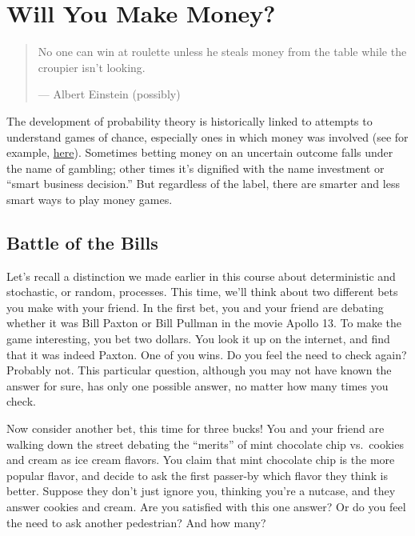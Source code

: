 \documentclass[openany]{book}
\begin{document}
\hypertarget{will-you-make-money}{%
\chapter*{Will You Make Money?}\label{will-you-make-money}}

\begin{quote}
No one can win at roulette unless he steals money from the table while the croupier isn't looking.

--- Albert Einstein (possibly)
\end{quote}

The development of probability theory is historically linked to attempts to understand games of chance, especially ones in which money was involved (see for example, \href{http://sites.math.rutgers.edu/~cherlin/History/Papers2000/cheng.html}{here}). Sometimes betting money on an uncertain outcome falls under the name of gambling; other times it's dignified with the name investment or ``smart business decision.'' But regardless of the label, there are smarter and less smart ways to play money games.

\hypertarget{battle-of-the-bills}{%
\section*{Battle of the Bills}\label{battle-of-the-bills}}

Let's recall a distinction we made earlier in this course about deterministic and stochastic, or random, processes. This time, we'll think about two different bets you make with your friend. In the first bet, you and your friend are debating whether it was Bill Paxton or Bill Pullman in the movie Apollo 13. To make the game interesting, you bet two dollars. You look it up on the internet, and find that it was indeed Paxton. One of you wins. Do you feel the need to check again? Probably not. This particular question, although you may not have known the answer for sure, has only one possible answer, no matter how many times you check.

Now consider another bet, this time for three bucks! You and your friend are walking down the street debating the ``merits'' of mint chocolate chip vs.~cookies and cream as ice cream flavors. You claim that mint chocolate chip is the more popular flavor, and decide to ask the first passer-by which flavor they think is better. Suppose they don't just ignore you, thinking you're a nutcase, and they answer cookies and cream. Are you satisfied with this one answer? Or do you feel the need to ask another pedestrian? And how many?
\end{document}
